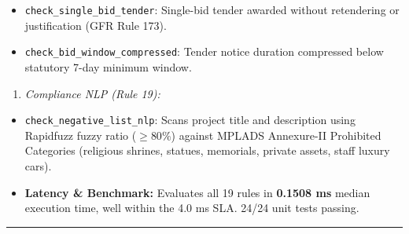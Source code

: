 \documentclass[11pt,a4paper]{article}
\begin{document}
\begin{itemize}[leftmargin=1.5em, itemsep=2pt, topsep=3pt]
\item \texttt{check\_single\_bid\_tender}: Single-bid tender awarded without retendering or justification (GFR Rule 173).
\item \texttt{check\_bid\_window\_compressed}: Tender notice duration compressed below statutory 7-day minimum window.
\end{itemize}
\begin{enumerate}[leftmargin=1.5em, itemsep=2pt, topsep=3pt]
\item \textit{Compliance NLP (Rule 19):}
\end{enumerate}
\begin{itemize}[leftmargin=1.5em, itemsep=2pt, topsep=3pt]
\item \texttt{check\_negative\_list\_nlp}: Scans project title and description using Rapidfuzz fuzzy ratio ($\ge 80\%$) against MPLADS Annexure-II Prohibited Categories (religious shrines, statues, memorials, private assets, staff luxury cars).
\item \textbf{Latency \& Benchmark:} Evaluates all 19 rules in \textbf{0.1508 ms} median execution time, well within the 4.0 ms SLA. 24/24 unit tests passing.
\end{itemize}

\vspace{1em}\hrule\vspace{1em}
\end{document}
